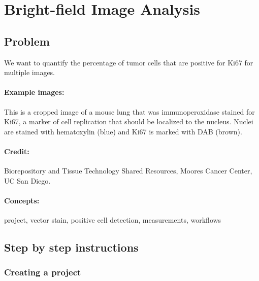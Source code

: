 \documentclass[a4paper,DIV=17,dvipsnames,headsepline]{scrartcl}
\begin{document}
\newpage
\section{Bright-field Image Analysis}
\subsection{Problem}

We want to quantify the percentage of tumor cells that are positive for Ki67 for multiple images.

\paragraph{Example images:} 
This is a cropped image of a mouse lung that was immunoperoxidase stained for Ki67, a marker of cell replication that should be localized to the nucleus.  Nuclei are stained with hematoxylin (blue) and Ki67 is marked with DAB (brown). 

\paragraph{Credit:} Biorepository and Tissue Technology Shared Resources, Moores Cancer Center, UC San Diego.

\paragraph{Concepts:} project, vector stain, positive cell detection, measurements, workflows

\subsection{Step by step instructions}
\subsubsection{Creating a project}
\end{document}

